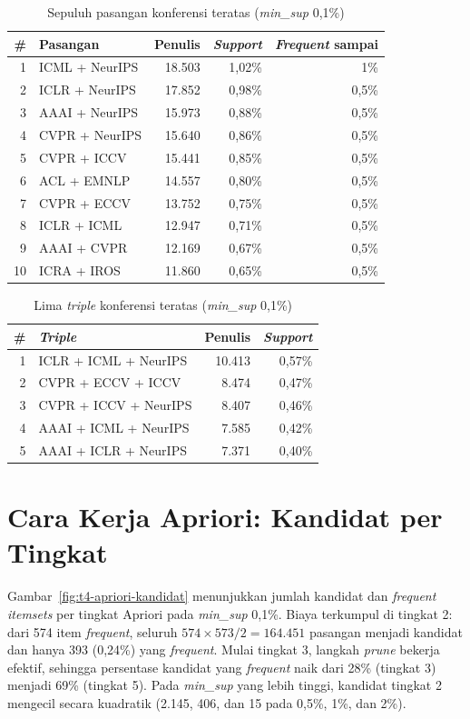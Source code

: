 \begin{table}[!htb]
\caption{Sepuluh pasangan konferensi teratas (\textit{min\_sup} 0,1\%)}
\label{tab:t4-pasangan}
\small
\begin{tabular*}{\textwidth}{@{\extracolsep{\fill}}@{}rlrrr@{}}
\toprule
\textbf{\#} & \textbf{Pasangan} & \textbf{Penulis} & \textbf{\textit{Support}} & \textbf{\textit{Frequent} sampai} \\
\midrule
1 & ICML + NeurIPS & 18.503 & 1,02\% & 1\% \\
2 & ICLR + NeurIPS & 17.852 & 0,98\% & 0,5\% \\
3 & AAAI + NeurIPS & 15.973 & 0,88\% & 0,5\% \\
4 & CVPR + NeurIPS & 15.640 & 0,86\% & 0,5\% \\
5 & CVPR + ICCV & 15.441 & 0,85\% & 0,5\% \\
6 & ACL + EMNLP & 14.557 & 0,80\% & 0,5\% \\
7 & CVPR + ECCV & 13.752 & 0,75\% & 0,5\% \\
8 & ICLR + ICML & 12.947 & 0,71\% & 0,5\% \\
9 & AAAI + CVPR & 12.169 & 0,67\% & 0,5\% \\
10 & ICRA + IROS & 11.860 & 0,65\% & 0,5\% \\
\bottomrule
\end{tabular*}
\end{table}

\begin{table}[!htb]
\caption{Lima \textit{triple} konferensi teratas (\textit{min\_sup} 0,1\%)}
\label{tab:t4-triple}
\small
\begin{tabular*}{\textwidth}{@{\extracolsep{\fill}}@{}rlrr@{}}
\toprule
\textbf{\#} & \textbf{\textit{Triple}} & \textbf{Penulis} & \textbf{\textit{Support}} \\
\midrule
1 & ICLR + ICML + NeurIPS & 10.413 & 0,57\% \\
2 & CVPR + ECCV + ICCV & 8.474 & 0,47\% \\
3 & CVPR + ICCV + NeurIPS & 8.407 & 0,46\% \\
4 & AAAI + ICML + NeurIPS & 7.585 & 0,42\% \\
5 & AAAI + ICLR + NeurIPS & 7.371 & 0,40\% \\
\bottomrule
\end{tabular*}
\end{table}

\section{Cara Kerja Apriori: Kandidat per Tingkat}
\label{sec:hasil-t4-apriori-kandidat}
Gambar~\ref{fig:t4-apriori-kandidat} menunjukkan jumlah kandidat dan \textit{frequent itemsets} per tingkat Apriori pada \textit{min\_sup} 0,1\%. Biaya terkumpul di tingkat 2: dari 574 item \textit{frequent}, seluruh $574 \times 573/2 = 164.451$ pasangan menjadi kandidat dan hanya 393 (0,24\%) yang \textit{frequent}. Mulai tingkat 3, langkah \textit{prune} bekerja efektif, sehingga persentase kandidat yang \textit{frequent} naik dari 28\% (tingkat 3) menjadi 69\% (tingkat 5). Pada \textit{min\_sup} yang lebih tinggi, kandidat tingkat 2 mengecil secara kuadratik (2.145, 406, dan 15 pada 0,5\%, 1\%, dan 2\%).

